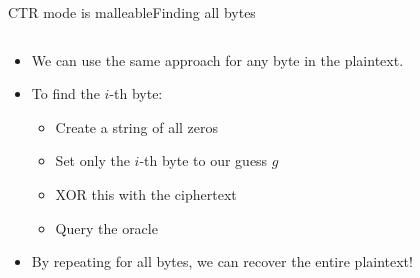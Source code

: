 \documentclass[aspectratio=169, lualatex, handout]{beamer}
\begin{document}
\begin{frame}{CTR mode is malleable}{Finding all bytes}
	\begin{columns}[c]
		\begin{column}{0.6\textwidth}
			\begin{itemize}[<+->]
				\item We can use the same approach for any byte in the plaintext.
				\item To find the $i$-th byte:
				      \begin{itemize}
					      \item Create a string of all zeros
					      \item Set only the $i$-th byte to our guess $g$
					      \item XOR this with the ciphertext
					      \item Query the oracle
				      \end{itemize}
				\item By repeating for all bytes, we can recover the entire plaintext!
			\end{itemize}
		\end{column}
		\begin{column}{0.4\textwidth}
		\end{column}
	\end{columns}
\end{frame}
\end{document}
